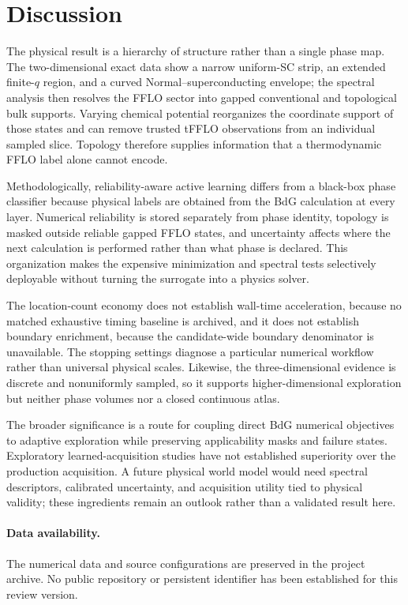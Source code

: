 \section{Discussion}
The physical result is a hierarchy of structure rather than a single phase map.  The two-dimensional exact data show a narrow uniform-SC strip, an extended finite-$q$ region, and a curved Normal--superconducting envelope; the spectral analysis then resolves the FFLO sector into gapped conventional and topological bulk supports.  Varying chemical potential reorganizes the coordinate support of those states and can remove trusted tFFLO observations from an individual sampled slice.  Topology therefore supplies information that a thermodynamic FFLO label alone cannot encode.

Methodologically, reliability-aware active learning differs from a black-box phase classifier because physical labels are obtained from the BdG calculation at every layer.  Numerical reliability is stored separately from phase identity, topology is masked outside reliable gapped FFLO states, and uncertainty affects where the next calculation is performed rather than what phase is declared.  This organization makes the expensive minimization and spectral tests selectively deployable without turning the surrogate into a physics solver.

The location-count economy does not establish wall-time acceleration, because no matched exhaustive timing baseline is archived, and it does not establish boundary enrichment, because the candidate-wide boundary denominator is unavailable.  The stopping settings diagnose a particular numerical workflow rather than universal physical scales.  Likewise, the three-dimensional evidence is discrete and nonuniformly sampled, so it supports higher-dimensional exploration but neither phase volumes nor a closed continuous atlas.

The broader significance is a route for coupling direct BdG numerical objectives to adaptive exploration while preserving applicability masks and failure states.  Exploratory learned-acquisition studies have not established superiority over the production acquisition.  A future physical world model would need spectral descriptors, calibrated uncertainty, and acquisition utility tied to physical validity; these ingredients remain an outlook rather than a validated result here.

\paragraph{Data availability.} The numerical data and source configurations are preserved in the project archive. No public repository or persistent identifier has been established for this review version.
